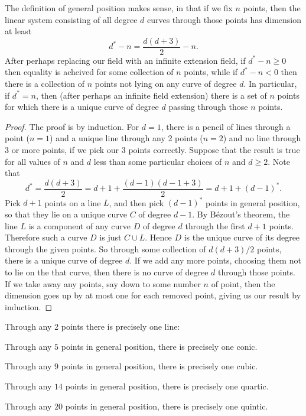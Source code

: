 \begin{lemma}\label{lemma:general.position.defined}
The definition of general position makes sense, in that if we fix \(n\) points, then the linear system consisting of all degree \(d\) curves through those points has dimension at least 
\[
d^*-n=\frac{d(d+3)}{2}-n.
\]
After perhaps replacing our field with an infinite extension field, if \(d^*-n \ge 0 \) then equality is acheived for some collection of \(n\) points, while if \(d^*-n<0\) then there is a collection of \(n\) points not lying on any curve of degree \(d\).
In particular, if \(d^*=n\), then (after perhaps an infinite field extension) there is a set of \(n\) points for which there is a unique curve of degree \(d\) passing through those \(n\) points.
\end{lemma}
\begin{proof}
The proof is by induction.
For \(d=1\), there is a pencil of lines through a point (\(n=1\)) and a unique line through any 2 points (\(n=2\)) and no line through 3 or more points, if we pick our 3 points correctly.
Suppose that the result is true for all values of \(n\) and \(d\) less than some particular choices of \(n\) and \(d \ge 2\).
Note that 
\[
d^*=\frac{d(d+3)}{2} = d+1+\frac{(d-1)(d-1+3)}{2} = d+1+(d-1)^*.
\]
Pick \(d+1\) points on a line \(L\), and then pick \((d-1)^*\) points in general position, so that they lie on a unique curve \(C\) of degree \(d-1\).
By B\'ezout's theorem, the line \(L\) is a component of any curve \(D\) of degree \(d\) through the first \(d+1\) points.
Therefore such a curve \(D\) is just \(C \cup L\).
Hence \(D\) is the unique curve of its degree through the given points.
So through some collection of \(d(d+3)/2\) points, there is a unique curve of degree \(d\).
If we add any more points, choosing them not to lie on the that curve, then there is no curve of degree \(d\) through those points.
If we take away any points, say down to some number \(n\) of point, then the dimension goes up by at most one for each removed point, giving us our result by induction.
\end{proof}
 
\begin{example}
Through any 2 points there is precisely one line: 
\end{example}
\begin{example}
Through any \(5\) points in general position, there is precisely one conic.
\end{example}
\begin{example}
Through any \(9\) points in general position, there is precisely one cubic.
\end{example}
\begin{example}
Through any \(14\) points in general position, there is precisely one quartic.
\end{example}
\begin{example}
Through any \(20\) points in general position, there is precisely one quintic.
\end{example}

